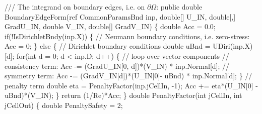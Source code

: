 {    /// The integrand on boundary edges, i.e. on $\partial \Omega$:
\btab public double BoundaryEdgeForm(ref CommonParamsBnd inp, \newline 
\btab \btab double[] U\_IN, double[,] GradU\_IN, double V\_IN, double[] GradV\_IN) \{\newline 
 \newline 
 \newline 
\btab \btab double Acc = 0.0;\newline 
 \newline 
\btab \btab if(!IsDirichletBndy(inp.X)) \{\newline 
\btab \btab \btab // Neumann boundary conditions, i.e. zero-stress:\newline 
\btab \btab \btab Acc = 0;\newline 
\btab \btab \} else \{\newline 
\btab \btab \btab // Dirichlet boundary conditions\newline 
\btab \btab \btab double uBnd = UDiri(inp.X)[d];\newline 
 \newline 
\btab \btab \btab for(int d = 0; d < inp.D; d++) \{ // loop over vector components \newline 
\btab \btab \btab \btab // consistency term:\newline 
\btab \btab \btab \btab Acc -= (GradU\_IN[0, d])*(V\_IN) * inp.Normal[d];\newline 
\btab \btab \btab \btab // symmetry term:\newline 
\btab \btab \btab \btab Acc -= (GradV\_IN[d])*(U\_IN[0]- uBnd) * inp.Normal[d];\newline 
\btab \btab \btab \}\newline 
 \newline 
\btab \btab \btab // penalty term\newline 
\btab \btab \btab double eta = PenaltyFactor(inp.jCellIn, -1);\newline 
\btab \btab \btab Acc += eta*(U\_IN[0] - uBnd)*(V\_IN);\newline 
\btab \btab \}\newline 
 \newline 
\btab \btab return (1/Re)*Acc;\newline 
\btab \}\newline 
 \newline 
\btab double PenaltyFactor(int jCellIn, int jCellOut) \{\newline 
\btab \btab double PenaltySafety = 2;\newline 
}

